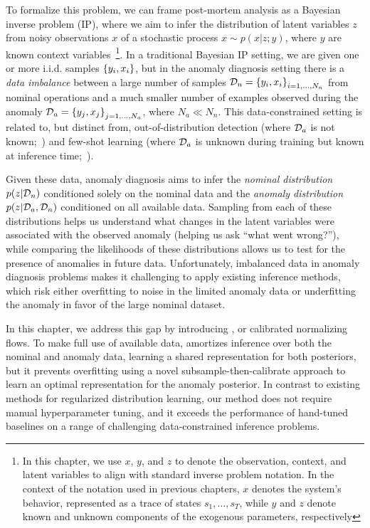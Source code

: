 To formalize this problem, we can frame post-mortem analysis as a Bayesian inverse problem (IP), where we aim to infer the distribution of latent variables $z$ from noisy observations $x$ of a stochastic process $x \sim p(x | z; y)$, where $y$ are known context variables~\cite{stuartInverseProblemsBayesian2010,molinaroNeuralInverseOperators2023,liuOptimizationAmortizedInverse2023,asimInvertibleGenerativeModels2020}\footnote{In this chapter, we use $x$, $y$, and $z$ to denote the observation, context, and latent variables to align with standard inverse problem notation. In the context of the notation used in previous chapters, $x$ denotes the system's behavior, represented as a trace of states $s_1, \ldots, s_T$, while $y$ and $z$ denote known and unknown components of the exogenous parameters, respectively}.
%
In a traditional Bayesian IP setting, we are given one or more i.i.d. samples $\left\{y_i, x_i\right\}$, but in the anomaly diagnosis setting there is a \textit{data imbalance} between a large number of samples $\mathcal{D}_n = \left\{y_i, x_i\right\}_{i=1, \ldots, N_n}$ from nominal operations and a much smaller number of examples observed during the anomaly $\mathcal{D}_a = \left\{y_j, x_j\right\}_{j=1, \ldots, N_a}$, where $N_a \ll N_n$. This data-constrained setting is related to, but distinct from, out-of-distribution detection (where $\mathcal{D}_a$ is not known;~\cite{liangEnhancingReliabilityOutofdistribution2020,hendrycksDeepAnomalyDetection2018,kirichenkoWhyNormalizingFlows2020}) and few-shot learning (where $\mathcal{D}_a$ is unknown during training but known at inference time;~\cite{wangGeneralizingFewExamples2020}).

Given these data, anomaly diagnosis aims to infer the \textit{nominal distribution} $p(z | \mathcal{D}_n)$ conditioned solely on the nominal data and the \textit{anomaly distribution} $p(z | \mathcal{D}_a, \mathcal{D}_n)$ conditioned on all available data. Sampling from each of these distributions helps us understand what changes in the latent variables were associated with the observed anomaly (helping us ask ``what went wrong?''), while comparing the likelihoods of these distributions allows us to test for the presence of anomalies in future data. Unfortunately, imbalanced data in anomaly diagnosis problems makes it challenging to apply existing inference methods, which risk either overfitting to noise in the limited anomaly data or underfitting the anomaly in favor of the large nominal dataset.

In this chapter, we address this gap by introducing \ouralg, or calibrated normalizing flows. To make full use of available data, \ouralg{} amortizes inference over both the nominal and anomaly data, learning a shared representation for both posteriors, but it prevents overfitting using a novel subsample-then-calibrate approach to learn an optimal representation for the anomaly posterior.
%
In contrast to existing methods for regularized distribution learning, our method does not require manual hyperparameter tuning, and it exceeds the performance of hand-tuned baselines on a range of challenging data-constrained inference problems.

